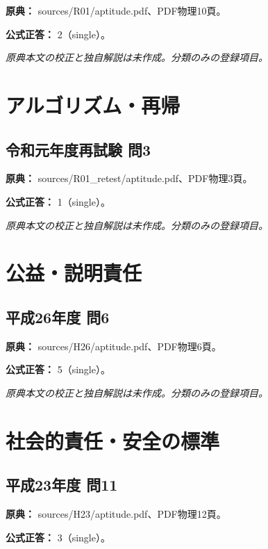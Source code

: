 \noindent\textbf{原典：} sources/R01/aptitude.pdf、PDF物理10頁。

\textbf{公式正答：} 2（single）。

\par\textit{原典本文の校正と独自解説は未作成。分類のみの登録項目。}

\section{アルゴリズム・再帰}

\subsection{令和元年度再試験 問3}
\label{q:r01-ret-apt-03}

\noindent\textbf{原典：} sources/R01\_retest/aptitude.pdf、PDF物理3頁。

\textbf{公式正答：} 1（single）。

\par\textit{原典本文の校正と独自解説は未作成。分類のみの登録項目。}

\section{公益・説明責任}

\subsection{平成26年度 問6}
\label{q:h26-reg-apt-06}

\noindent\textbf{原典：} sources/H26/aptitude.pdf、PDF物理6頁。

\textbf{公式正答：} 5（single）。

\par\textit{原典本文の校正と独自解説は未作成。分類のみの登録項目。}

\section{社会的責任・安全の標準}

\subsection{平成23年度 問11}
\label{q:h23-reg-apt-11}

\noindent\textbf{原典：} sources/H23/aptitude.pdf、PDF物理12頁。

\textbf{公式正答：} 3（single）。

